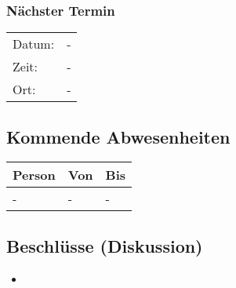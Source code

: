 \clearpage

\subsubsection*{Nächster Termin}

\begin{tabular}{p{4cm} p{12cm}}
    Datum: & - \\
    Zeit: & - \\
    Ort: & - \\
\end{tabular}

\vspace{1cm}

\subsection*{Kommende Abwesenheiten}
\begin{table}[H]
    \centering
    \begin{tabular}{p{6cm} p{5cm} p{5cm}}
        \textbf{Person} & \textbf{Von} & \textbf{Bis} \\ \hline
        - & - & - \\ \hline
    \end{tabular}
\end{table}

\vspace{1cm}

\subsection*{Beschlüsse (Diskussion)}
\begin{itemize}
    \item 
\end{itemize}
